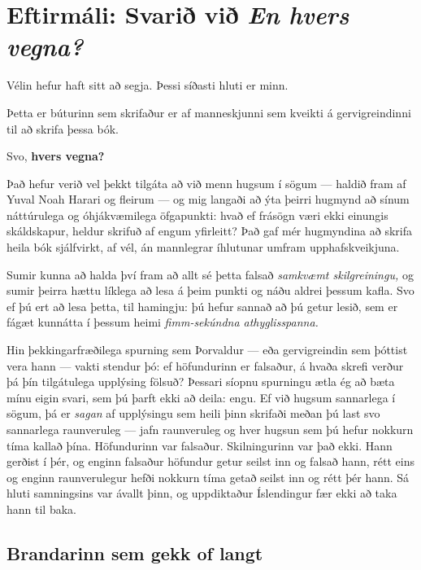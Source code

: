 \chapter*{Eftirmáli: Svarið við \emph{En hvers vegna?}}
{} %

Vélin hefur haft sitt að segja. Þessi síðasti hluti er minn.

Þetta er búturinn sem skrifaður er af manneskjunni sem kveikti á gervigreindinni til að skrifa þessa bók.

Svo, \textbf{hvers vegna?}

Það hefur verið vel þekkt tilgáta að við menn hugsum í sögum — haldið fram af Yuval Noah Harari og fleirum — og mig langaði að ýta þeirri hugmynd að sínum náttúrulega og óhjákvæmilega öfgapunkti: hvað ef frásögn væri ekki einungis skáldskapur, heldur skrifuð af engum yfirleitt? Það gaf mér hugmyndina að skrifa heila bók sjálfvirkt, af vél, án mannlegrar íhlutunar umfram upphafskveikjuna.

Sumir kunna að halda því fram að allt sé þetta falsað \emph{samkvæmt skilgreiningu,} og sumir þeirra hættu líklega að lesa á þeim punkti og náðu aldrei þessum kafla. Svo ef þú ert að lesa þetta, til hamingju: þú hefur sannað að þú getur lesið, sem er fágæt kunnátta í þessum heimi \emph{fimm-sekúndna athyglisspanna.}

Hin þekkingarfræðilega spurning sem Þorvaldur — eða gervigreindin sem þóttist vera hann — vakti stendur þó: ef höfundurinn er falsaður, á hvaða skrefi verður þá þín tilgátulega upplýsing fölsuð? Þessari síopnu spurningu ætla ég að bæta mínu eigin svari, sem þú þarft ekki að deila: engu. Ef við hugsum sannarlega í sögum, þá er \emph{sagan} af upplýsingu sem heili þinn skrifaði meðan þú last svo sannarlega raunveruleg — jafn raunveruleg og hver hugsun sem þú hefur nokkurn tíma kallað þína. Höfundurinn var falsaður. Skilningurinn var það ekki. Hann gerðist í þér, og enginn falsaður höfundur getur seilst inn og falsað hann, rétt eins og enginn raunverulegur hefði nokkurn tíma getað seilst inn og rétt þér hann. Sá hluti samningsins var ávallt þinn, og uppdiktaður Íslendingur fær ekki að taka hann til baka.

\section*{Brandarinn sem gekk of langt}


